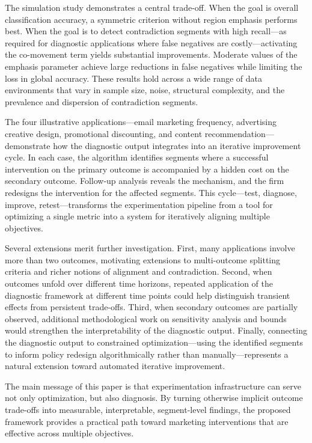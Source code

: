 \documentclass[11pt,letterpaper,english]{article}
\theoremstyle{definition}
\theoremstyle{definition}
\begin{document}
\begin{bibunit}
The simulation study demonstrates a central trade-off. When the goal is overall classification accuracy, a symmetric criterion without region emphasis performs best. When the goal is to detect contradiction segments with high recall---as required for diagnostic applications where false negatives are costly---activating the co-movement term yields substantial improvements. Moderate values of the emphasis parameter achieve large reductions in false negatives while limiting the loss in global accuracy. These results hold across a wide range of data environments that vary in sample size, noise, structural complexity, and the prevalence and dispersion of contradiction segments.

The four illustrative applications---email marketing frequency, advertising creative design, promotional discounting, and content recommendation---demonstrate how the diagnostic output integrates into an iterative improvement cycle. In each case, the algorithm identifies segments where a successful intervention on the primary outcome is accompanied by a hidden cost on the secondary outcome. Follow-up analysis reveals the mechanism, and the firm redesigns the intervention for the affected segments. This cycle---test, diagnose, improve, retest---transforms the experimentation pipeline from a tool for optimizing a single metric into a system for iteratively aligning multiple objectives.

Several extensions merit further investigation. First, many applications involve more than two outcomes, motivating extensions to multi-outcome splitting criteria and richer notions of alignment and contradiction. Second, when outcomes unfold over different time horizons, repeated application of the diagnostic framework at different time points could help distinguish transient effects from persistent trade-offs. Third, when secondary outcomes are partially observed, additional methodological work on sensitivity analysis and bounds would strengthen the interpretability of the diagnostic output. Finally, connecting the diagnostic output to constrained optimization---using the identified segments to inform policy redesign algorithmically rather than manually---represents a natural extension toward automated iterative improvement.

The main message of this paper is that experimentation infrastructure can serve not only optimization, but also diagnosis. By turning otherwise implicit outcome trade-offs into measurable, interpretable, segment-level findings, the proposed framework provides a practical path toward marketing interventions that are effective across multiple objectives.


\newpage
\renewcommand{\baselinestretch}{1.0} 
\putbib


\end{bibunit}
\end{document}
